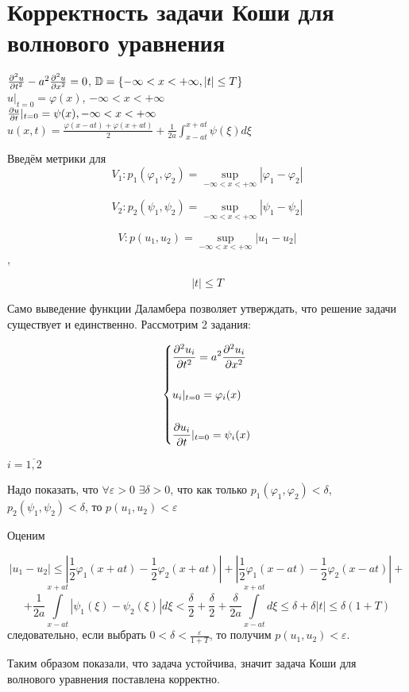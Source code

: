 \documentclass[../main.tex]{subfiles}
\begin{document}
\section{Корректность задачи Коши для волнового уравнения}
\begin{large}
    \begin{center}
        $\frac{\partial^2 u}{\partial t^2}-a^2\frac{\partial^2 u}{\partial x^2}=0$, $\mathbb{D}=\{ -\infty<x<+\infty, |t|\leq T\rbrace$\\
        $ $\\
        $ u|_{t=0} = \varphi(x)$, $-\infty<x<+\infty$\\ 
        $ $\\
        $\frac{\partial u}{\partial t}|_{t=0} = \psi(x),  -\infty<x<+\infty$\\
        $ $\\
        $u(x,t)=\frac{\varphi(x-at)+\varphi(x+at)}{2}+\frac{1}{2a}\int_{x-at}^{x+at}\psi(\xi)d\xi$
    \end{center}
\end{large}
Введём метрики для
$$V_1:p_1(\varphi_1,\varphi_2)=\sup_{-\infty<x<+\infty}|\varphi_1-\varphi_2|$$

$$V_2:p_2(\psi_1,\psi_2)=\sup_{-\infty<x<+\infty}|\psi_1-\psi_2|$$

$$V:p(u_1,u_2)=\sup_{-\infty<x<+\infty}|u_1-u_2|$$,

$$|t| \leq T$$

Само выведение функции Даламбера позволяет утверждать, что решение задачи существует и единственно. Рассмотрим 2 задания:

$$\begin{dcases}
\frac{\partial^2 u_i}{\partial t^2}=a^2\frac{\partial^2 u_i}{\partial x^2}\\\\
     u_i|_{t=0}=\varphi_i(x)\\\\
     \frac{\partial u_i}{\partial t}|_{t=0}=\psi_i(x)
\end{dcases} $$ 

$i=\overline{1,2}$

Надо показать, что $\forall \varepsilon > 0$  $\exists \delta > 0$,  что как только $p_1(\varphi_1, \varphi_2)<\delta$, $p_2(\psi_1, \psi_2)<\delta$, то $p(u_1, u_2)<\varepsilon$

Оценим

\[|u_1-u_2| \leq \left|\frac{1}{2}\varphi_1(x+at)-\frac{1}{2}\varphi_2(x+at)\right|+\left|\frac{1}{2}\varphi_1(x-at)-\frac{1}{2}\varphi_2(x-at)\right|+\]
\[+\frac{1}{2a}\int\limits_{x-at}^{x+at}|\psi_1(\xi)-\psi_2(\xi)|d\xi<\frac{\delta}{2}+\frac{\delta}{2}+\frac{\delta}{2a}\int\limits_{x-at}^{x+at}d\xi \leq \delta+\delta|t| \leq \delta(1+T)\] следовательно, если выбрать $0<\delta<\frac{\varepsilon}{1+T}$, то получим $p(u_1, u_2)<\varepsilon$.

Таким образом показали, что задача устойчива, значит задача Коши для волнового уравнения поставлена корректно.
\end{document}
